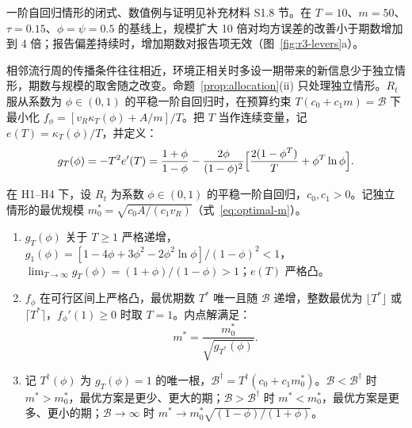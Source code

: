 一阶自回归情形的闭式、数值例与证明见补充材料 S1.8 节。在 $T=10$、$m=50$、$\tau=0.15$、$\phi=\psi=0.5$ 的基线上，规模扩大 10 倍对均方误差的改善小于期数增加到 4 倍；报告偏差持续时，增加期数对报告项无效（图~\ref{fig:r3-levers}a）。

相邻流行周的传播条件往往相近，环境正相关时多设一期带来的新信息少于独立情形，期数与规模的取舍随之改变。命题~\ref{prop:allocation}(ii) 只处理独立情形。$R_t$ 服从系数为 $\phi\in(0,1)$ 的平稳一阶自回归时，在预算约束 $T(c_0+c_1m)=\mathcal B$ 下最小化 $f_\phi=[v_R\kappa_T(\phi)+A/m]/T$。把 $T$ 当作连续变量，记 $e(T)=\kappa_T(\phi)/T$，并定义：
\begin{equation}
  g_T(\phi)=-T^2e'(T)=\frac{1+\phi}{1-\phi}-\frac{2\phi}{(1-\phi)^2}\Bigl[\frac{2(1-\phi^T)}{T}+\phi^T\ln\phi\Bigr].
  \label{eq:r3-g}
\end{equation}

\begin{proposition}[一阶自回归下的最优期数与规模]
\label{prop:ar-design}
在 H1--H4 下，设 $R_t$ 为系数 $\phi\in(0,1)$ 的平稳一阶自回归，$c_0,c_1>0$。记独立情形的最优规模 $m_0^*=\sqrt{c_0A/(c_1v_R)}$（式~\eqref{eq:optimal-m}）。
\begin{enumerate}[label=(\roman*)]
  \item $g_T(\phi)$ 关于 $T\geq1$ 严格递增，$g_1(\phi)=[1-4\phi+3\phi^2-2\phi^2\ln\phi]/(1-\phi)^2<1$，$\lim_{T\to\infty}g_T(\phi)=(1+\phi)/(1-\phi)>1$；$e(T)$ 严格凸。
  \item $f_\phi$ 在可行区间上严格凸，最优期数 $T^*$ 唯一且随 $\mathcal B$ 递增，整数最优为 $\lfloor T^*\rfloor$ 或 $\lceil T^*\rceil$，$f_\phi'(1)\geq0$ 时取 $T=1$。内点解满足：
  \begin{equation}
    m^*=\frac{m_0^*}{\sqrt{g_{T^*}(\phi)}} .
    \label{eq:r3-mstar}
  \end{equation}
  \item 记 $T^\dagger(\phi)$ 为 $g_T(\phi)=1$ 的唯一根，$\mathcal B^\dagger=T^\dagger(c_0+c_1m_0^*)$。$\mathcal B<\mathcal B^\dagger$ 时 $m^*>m_0^*$，最优方案是更少、更大的期；$\mathcal B>\mathcal B^\dagger$ 时 $m^*<m_0^*$，最优方案是更多、更小的期；$\mathcal B\to\infty$ 时 $m^*\to m_0^*\sqrt{(1-\phi)/(1+\phi)}$。
\end{enumerate}
\end{proposition}

